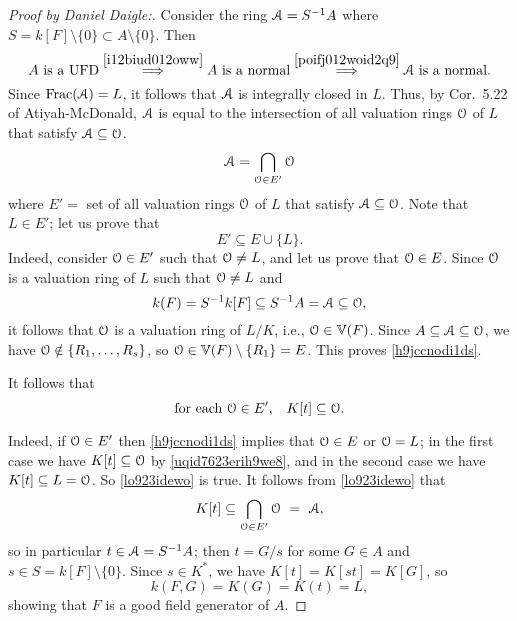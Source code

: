 \begin{proof}[Proof by Daniel Daigle:]
Consider the ring $\EuScript{A} = S^{-1}A$ where $S =  k[F] \setminus \{0\} \subset A \setminus \{0\}$. 
Then
$$
\text{$A$ is a UFD} \overset{\ref{i12biud012oww}}{\implies} \text{$A$ is a normal}
\overset{\ref{poifj012woid2q9}}{\implies} \text{$\EuScript{A}$ is a normal} .
$$
Since $\operatorname{{\rm Frac}}( \EuScript{A} ) = L$, it follows that $\EuScript{A}$ is integrally closed in $L$. Thus, 
by Cor.~5.22 of Atiyah-McDonald,
$\EuScript{A}$ is equal to the intersection of all valuation rings $\EuScript{O}$ 
of $L$ that satisfy $\EuScript{A} \subseteq \EuScript{O}$.
\begin{equation} \label {bcdkoi23w9eje}
\EuScript{A} = \bigcap_{\EuScript{O} \in E'} \EuScript{O}
\end{equation}
where $E'=$ set of all valuation rings $\EuScript{O}$ of $L$ that satisfy $\EuScript{A} \subseteq \EuScript{O}$.
Note that $L \in E'$; let us prove that 
\begin{equation} \label {h9jccnodi1ds}
E' \subseteq E \cup \{ L \} .
\end{equation}
Indeed, consider $\EuScript{O} \in E'$ such that $\EuScript{O} \neq L$, and let us prove that  $\EuScript{O}  \in E$.
Since $\EuScript{O}$ is a valuation ring of $L$ such that $\EuScript{O} \neq L$ and
$$
 k(F) = S^{-1}  k[F] \subseteq S^{-1}A = \EuScript{A} \subseteq \EuScript{O},
$$ 
it follows that $\EuScript{O}$ is a valuation ring of $L/K$, i.e., $\EuScript{O} \in \mathbb{V}(F)$. Since
$A \subseteq \EuScript{A} \subseteq \EuScript{O}$, we have $\EuScript{O} \notin \{ R_1, \dots, R_s \}$,
so $\EuScript{O} \in \mathbb{V}(F) \setminus \{R_1\} = E$. This proves \eqref{h9jccnodi1ds}.

It follows that
\begin{equation} \label {lo923idewo}
\text{for each $\EuScript{O} \in E'$,\quad  $K[t] \subseteq \EuScript{O}$.}
\end{equation}

Indeed, if $\EuScript{O} \in E'$ then \eqref{h9jccnodi1ds} implies that $\EuScript{O} \in E$ or $\EuScript{O}=L$;
in the first case we have $K[t] \subseteq \EuScript{O}$ by \eqref{uqid7623erih9we8},
and in the second case we have $K[t] \subseteq L = \EuScript{O}$. So \eqref{lo923idewo} is true.
It follows from \eqref{lo923idewo} that
$$
K[t] \subseteq \bigcap_{\Oeul \in E'} \Oeul\ =\ \Aeul,
$$
so in particular $t \in \EuScript{A} = S^{-1}A$; then $t = G/s$ for 
some $G \in A$ and $s \in S =  k[F] \setminus \{0\}$.
Since $s \in K^*$, we have $K[t] = K[st] = K[G]$, so 
$$
 k(F,G) = K(G) = K(t) = L,
$$
showing that $F$ is a good field generator of $A$.
\end{proof}




